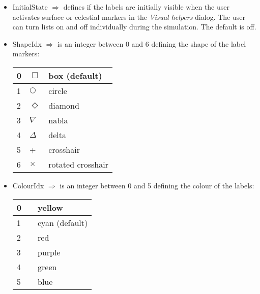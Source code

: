 \documentclass[Orbiter Developer Manual.tex]{subfiles}
\begin{document}
\begin{itemize}
\item InitialState $\Rightarrow$ defines if the labels are initially visible when the user activates surface or celestial markers in the \textit{Visual helpers} dialog. The user can turn lists on and off individually during the simulation. The default is off.
\item ShapeIdx $\Rightarrow$ is an integer between 0 and 6 defining the shape of the label markers:

	\begin{longtable}{ |p{}|p{}|p{}| }
	\hline\rule{0pt}{2ex}
	0 & $\Box$ & box (default)\\
	\hline\rule{0pt}{2ex}
	1 & $\bigcirc$ & circle\\
	\hline\rule{0pt}{2ex}
	2 & $\Diamond$ & diamond\\
	\hline\rule{0pt}{2ex}
	3 & $\nabla$ & nabla\\
	\hline\rule{0pt}{2ex}
	4 & $\Delta$ & delta\\
	\hline\rule{0pt}{2ex}
	5 & + & crosshair\\
	\hline\rule{0pt}{2ex}
	6 & $\times$ & rotated crosshair\\
	\hline
	\end{longtable}

\item ColourIdx $\Rightarrow$ is an integer between 0 and 5 defining the colour of the labels:

	\begin{longtable}{ |p{}|p{}|p{}| }
	\hline\rule{0pt}{2ex}
	0 & \cellcolor{yellow!100} & yellow\\
	\hline\rule{0pt}{2ex}
	1 & \cellcolor{cyan!50} & cyan (default)\\
	\hline\rule{0pt}{2ex}
	2 & \cellcolor{red!100} & red\\
	\hline\rule{0pt}{2ex}
	3 & \cellcolor{purple!50} & purple\\
	\hline\rule{0pt}{2ex}
	4 & \cellcolor{green!100} & green\\
	\hline\rule{0pt}{2ex}
	5 & \cellcolor{blue!50} & blue\\
	\hline
	\end{longtable}


\end{itemize}
\end{document}
